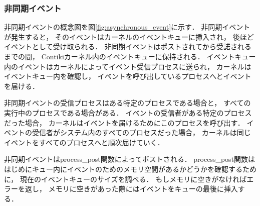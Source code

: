 \subsubsection{非同期イベント}\label{sec:asynchronous_event}

\vspace{0.5em}非同期イベントの概念図を図\ref{fig:asynchronous_event}に示す．
非同期イベントが発生すると，
そのイベントはカーネルのイベントキューに挿入され，
後ほどイベントとして受け取られる．
非同期イベントはポストされてから受諾されるまでの間，
Contikiカーネル内のイベントキューに保持される．
イベントキュー内のイベントはカーネルによってイベント受信プロセスに送られ，
カーネルはイベントキュー内を確認し，
イベントを呼び出しているプロセスへとイベントを届ける．

非同期イベントの受信プロセスはある特定のプロセスである場合と，
すべての実行中のプロセスである場合がある．
イベントの受信者がある特定のプロセスだった場合，
カーネルはイベントを届けるためにこのプロセスを呼び出す．
イベントの受信者がシステム内のすべてのプロセスだった場合，
カーネルは同じイベントをすべてのプロセスへと順次届けていく．

非同期イベントはprocess\_post関数によってポストされる．
process\_post関数ははじめにキュー内にイベントのためのメモリ空間があるかどうかを確認するために，
現在のイベントキューのサイズを調べる．
もしメモリに空きがなければエラーを返し，
メモリに空きがあった際にはイベントをキューの最後に挿入する．


